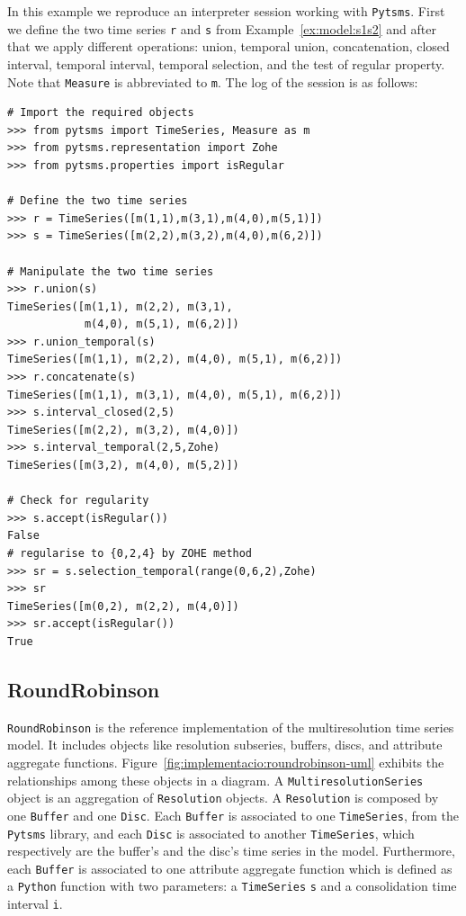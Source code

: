 \begin{example}
  \label{ex:pytsms:example}
  In this example we reproduce an interpreter session working with
  \texttt{Pytsms}. First we define the two time series \texttt{r} and
  \texttt{s} from Example~\ref{ex:model:s1s2} and after that we apply
  different operations: union, temporal union, concatenation, closed
  interval, \zohe{} temporal interval, \zohe{} temporal selection, and
  the test of regular property. Note that \texttt{Measure} is
  abbreviated to \texttt{m}. The log of the session is as follows:

  {\small
\begin{verbatim}
# Import the required objects
>>> from pytsms import TimeSeries, Measure as m
>>> from pytsms.representation import Zohe
>>> from pytsms.properties import isRegular

# Define the two time series
>>> r = TimeSeries([m(1,1),m(3,1),m(4,0),m(5,1)])
>>> s = TimeSeries([m(2,2),m(3,2),m(4,0),m(6,2)])

# Manipulate the two time series
>>> r.union(s)
TimeSeries([m(1,1), m(2,2), m(3,1), 
            m(4,0), m(5,1), m(6,2)])
>>> r.union_temporal(s)
TimeSeries([m(1,1), m(2,2), m(4,0), m(5,1), m(6,2)])
>>> r.concatenate(s) 
TimeSeries([m(1,1), m(3,1), m(4,0), m(5,1), m(6,2)])
>>> s.interval_closed(2,5)
TimeSeries([m(2,2), m(3,2), m(4,0)])
>>> s.interval_temporal(2,5,Zohe)
TimeSeries([m(3,2), m(4,0), m(5,2)])

# Check for regularity
>>> s.accept(isRegular())
False
# regularise to {0,2,4} by ZOHE method
>>> sr = s.selection_temporal(range(0,6,2),Zohe)
>>> sr
TimeSeries([m(0,2), m(2,2), m(4,0)])
>>> sr.accept(isRegular())
True
\end{verbatim}
}
\end{example}





\subsection{RoundRobinson}

\texttt{RoundRobinson} is the reference implementation of the
multiresolution time series model. It includes objects like resolution
subseries, buffers, discs, and attribute aggregate
functions. Figure~\ref{fig:implementacio:roundrobinson-uml} exhibits
the relationships among these objects in a  diagram.  A
\texttt{MultiresolutionSeries} object is an aggregation of
\texttt{Resolution} objects. A \texttt{Resolution} is composed by one
\texttt{Buffer} and one \texttt{Disc}. Each \texttt{Buffer} is
associated to one \texttt{TimeSeries}, from the \texttt{Pytsms}
library, and each \texttt{Disc} is associated to another
\texttt{TimeSeries}, which respectively are the buffer's and the
disc's time series in the  model. Furthermore, each
\texttt{Buffer} is associated to one attribute aggregate function
which is defined as a \texttt{Python} function with two parameters: a
\texttt{TimeSeries} \texttt{s} and a consolidation time interval
\texttt{i}.

